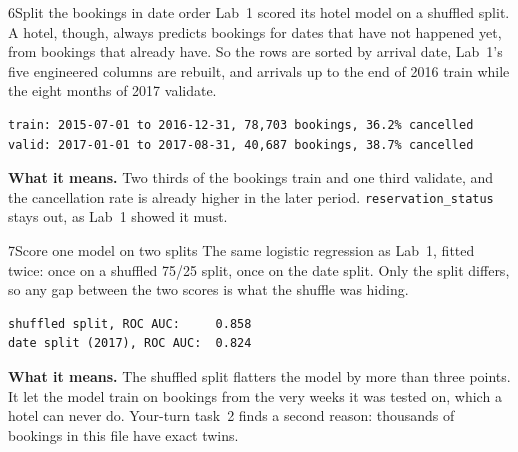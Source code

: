 \begin{labquestion}{6}{Split the bookings in date order}
Lab~1 scored its hotel model on a shuffled split. A hotel, though, always predicts bookings for dates that have not happened yet, from bookings that already have. So the rows are sorted by arrival date, Lab~1's five engineered columns are rebuilt, and arrivals up to the end of 2016 train while the eight months of 2017 validate.
\end{labquestion}
\begin{labanswer}

\begin{refoutput}
\begin{lstlisting}[style=utpterminal]
train: 2015-07-01 to 2016-12-31, 78,703 bookings, 36.2% cancelled
valid: 2017-01-01 to 2017-08-31, 40,687 bookings, 38.7% cancelled
\end{lstlisting}
\end{refoutput}

\textbf{What it means.} Two thirds of the bookings train and one third validate, and the cancellation rate is already higher in the later period. \texttt{reservation\_status} stays out, as Lab~1 showed it must.
\end{labanswer}

\begin{labquestion}{7}{Score one model on two splits}
The same logistic regression as Lab~1, fitted twice: once on a shuffled 75/25 split, once on the date split. Only the split differs, so any gap between the two scores is what the shuffle was hiding.
\end{labquestion}
\begin{labanswer}

\begin{refoutput}
\begin{lstlisting}[style=utpterminal]
shuffled split, ROC AUC:     0.858
date split (2017), ROC AUC:  0.824
\end{lstlisting}
\end{refoutput}

\textbf{What it means.} The shuffled split flatters the model by more than three points. It let the model train on bookings from the very weeks it was tested on, which a hotel can never do. Your-turn task~2 finds a second reason: thousands of bookings in this file have exact twins.
\end{labanswer}


